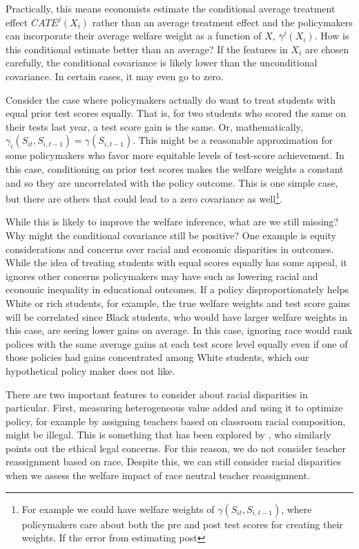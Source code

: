 \documentclass[12pt]{article}
\theoremstyle{definition}
\theoremstyle{definition}
\theoremstyle{definition}
\theoremstyle{definition}
\begin{document}
    Practically, this means economists estimate the conditional average treatment effect $ CATE^j(X_i)$ rather than an average treatment effect and the policymakers can incorporate their average welfare weight as a function of $X$,  $\bar{\gamma}^j(X_i)$.  How is this conditional estimate better than an average? If the features in $X_i$ are chosen carefully, the conditional covariance is likely lower than the unconditional covariance. In certain cases, it may even go to zero. 
    
    Consider the case where policymakers actually do want to treat students with equal prior test scores equally. That is, for two students who scored the same on their tests last year, a test score gain is the same. Or, mathematically, $\gamma_i(S_{it}, S_{i,t-1}) = \gamma(S_{i,t-1})$. This might be a reasonable approximation for some policymakers who favor more equitable levels of test-score achievement. In this case, conditioning on prior test scores makes the welfare weights a constant and so they are uncorrelated with the policy outcome. This is one simple case, but there are others that could lead to a zero covariance as well\footnote{For example we could have welfare weights of $\gamma(S_{it}, S_{i,t-1})$, where policymakers care about both the pre and post test scores for creating their weights. If the error from estimating post }.  
    
    While this is likely to improve the welfare inference, what are we still missing? Why might the conditional covariance still be positive? One example is equity considerations and concerns over racial and economic disparities in outcomes. While the idea of treating students with equal scores equally has some appeal, it ignores other concerns policymakers may have such as lowering racial and economic inequality in educational outcomes. If a policy disproportionately helps White or rich students, for example, the true welfare weights and test score gains will be correlated since Black students, who would have larger welfare weights in this case, are seeing lower gains on average. In this case, ignoring race would rank polices with the same average gains at each test score level equally even if one of those policies had gains concentrated among White students, which our hypothetical policy maker does not like.

    There are two important features to consider about racial disparities in particular. First, measuring heterogeneous value added and using it to optimize policy, for example by assigning teachers based on classroom racial composition, might be illegal. This is something that has been explored by \citet{Delgado2020}, who similarly points out the ethical legal concerns. For this reason, we do not consider teacher reassignment based on race. Despite this, we can still consider racial disparities when we assess the welfare impact of race neutral teacher reassignment. 
    
\end{document}
